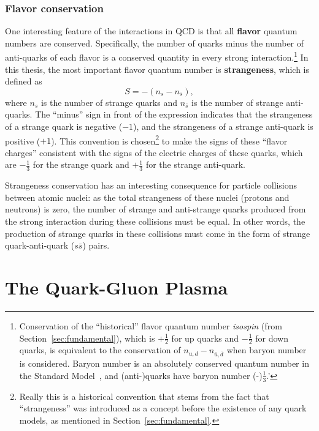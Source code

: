 \subsubsection{Flavor conservation}
\label{sec:flavor_conservation}

One interesting feature of the interactions in QCD is that all \textbf{flavor} quantum numbers are conserved. Specifically, the number of quarks minus the number of anti-quarks of each flavor is a conserved quantity in every strong interaction.\footnote{Conservation of the ``historical'' flavor quantum number \textit{isospin} (from Section~\ref{sec:fundamental}), which is $+\frac{1}{2}$ for up quarks and $-\frac{1}{2}$ for down quarks, is equivalent to the conservation of $n_{u,d} - n_{\bar{u}, \bar{d}}$ when baryon number is considered. Baryon number is an absolutely conserved quantum number in the Standard Model~\cite{PDG}, and (anti-)quarks have baryon number (-)$\frac{1}{3}$.'} In this thesis, the most important flavor quantum number is \textbf{strangeness}, which is defined as
%
\begin{equation}
    \label{eq:strangeness}
    S = - (n_s - n_{\bar{s}}),
\end{equation}
where $n_s$ is the number of strange quarks and $n_{\bar{s}}$ is the number of strange anti-quarks. The ``minus'' sign in front of the expression indicates that the strangeness of a strange quark is negative ($-1$), and the strangeness of a strange anti-quark is positive ($+1$). This convention is chosen\footnote{Really this is a historical convention that stems from the fact that ``strangeness'' was introduced as a concept before the existence of any quark models, as mentioned in Section~\ref{sec:fundamental}.} to make the signs of these ``flavor charges'' consistent with the signs of the electric charges of these quarks, which are $-\frac{1}{3}$ for the strange quark and $+\frac{1}{3}$ for the strange anti-quark. 

Strangeness conservation has an interesting consequence for particle collisions between atomic nuclei: as the total strangeness of these nuclei (protons and neutrons) is zero, the number of strange and anti-strange quarks produced from the strong interaction during these collisions must be equal. In other words, the production of strange quarks in these collisions must come in the form of strange quark-anti-quark ($s\bar{s}$) pairs.

\clearpage

\section{The Quark-Gluon Plasma}
\label{sec:qgp_theory}

